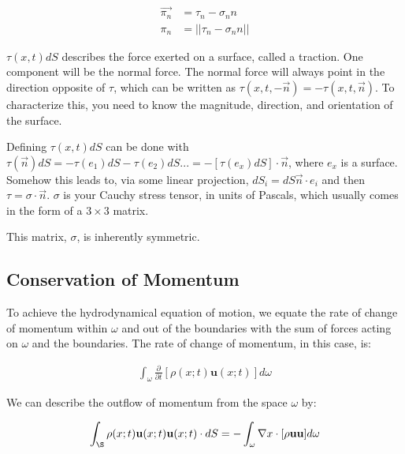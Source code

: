 \documentclass[12pt]{report}
\begin{document}
\begin{equation} \label{phenom1}
\begin{split}
\Vec{\pi_n} &= \tau_n - \sigma_nn \\
\pi_n &= ||\tau_n - \sigma_nn ||
\end{split}
\end{equation}

$\tau(x,t)dS$ describes the force exerted on a surface, called a traction. One component will be the normal force. The normal force will always point in the direction opposite of $\tau$, which can be written as $\tau(x,t,-\Vec{n}) = -\tau(x,t,\Vec{n})$. To characterize this, you need to know the magnitude, direction, and orientation of the surface.\newline

Defining $\tau(x,t)dS$ can be done with $\tau(\Vec{n})dS = -\tau(e_1)dS - \tau(e_2)dS ... = -[\tau(e_x)dS]\cdot \Vec{n}$, where $e_x$ is a surface. Somehow this leads to, via some linear projection, $dS_i = dS \Vec{n}\cdot e_i$ and then $\tau = \sigma \cdot \Vec{n}$. $\sigma$ is your Cauchy stress tensor, in units of Pascals, which usually comes in the form of a $3\times3$ matrix. \newline 

This matrix, $\sigma$, is inherently symmetric. 



\subsection{Conservation of Momentum}

To achieve the hydrodynamical equation of motion, we equate the rate of change of momentum within $\omega$ and out of the boundaries with the sum of forces acting on $\omega$ and the boundaries. The rate of change of momentum, in this case, is:

\begin{equation} \label{phenom1}
\begin{split}
\int_\omega\frac{\partial}{\partial t}[\rho(x;t)\mathbf{u}(x;t)]d\omega
\end{split}
\end{equation}

We can describe the outflow of momentum from the space $\omega$ by:

\begin{equation} \label{phenom1}
\begin{split}
\int_\S \rho(x;t)\mathbf{u}(x;t)\mathbf{u}(x;t) \cdot dS = -\int_\omega \nabla x \cdot [\rho \mathbf{u}\mathbf{u}]d\omega
\end{split}
\end{equation}
\end{document}
